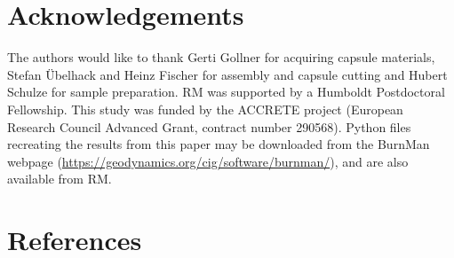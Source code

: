 \documentclass[review]{elsarticle}
\begin{document}
\section{Acknowledgements}
The authors would like to thank Gerti Gollner for acquiring capsule materials, Stefan \"Ubelhack and Heinz Fischer for assembly and capsule cutting and Hubert Schulze for sample preparation. RM was supported by a Humboldt Postdoctoral Fellowship. This study was funded by the ACCRETE project (European Research Council Advanced Grant, contract number 290568). Python files recreating the results from this paper may be downloaded from the BurnMan webpage (\url{https://geodynamics.org/cig/software/burnman/}), and are also available from RM.

\clearpage
\section*{References}


\end{document}

